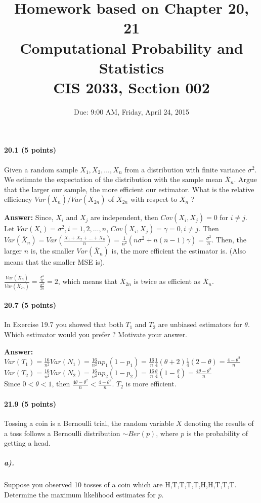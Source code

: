\documentclass{article} %
\title{Homework based on Chapter 20, 21\\
Computational Probability and Statistics \\
CIS 2033, Section 002}
\author{Due: 9:00 AM, Friday, April 24, 2015}
\begin{document}
\maketitle

\paragraph*{20.1 (5 points)} Given a random sample $X_1, X_2, \ldots, X_n$ from a distribution with finite variance $\sigma^2$. We estimate the expectation of the distribution with the sample mean $\overline{X}_n$. Argue that the larger our sample, the more efficient our estimator. What is the relative efficiency $Var(\overline{X}_n)/Var(\overline{X}_{2n})$ of $\overline{X}_{2n}$ with respect to $\overline{X}_n$ ? 

{\bf Answer:}  Since, $X_i$ and $X_j$  are independent, then $Cov(X_i, X_j) = 0$ for $i\neq j$. 
Let $Var(X_i) = \sigma^2, i=1, 2, \ldots, n$, $Cov(X_i, X_j) = \gamma = 0, i\neq j$. Then
$Var(\overline{X}_n) = Var(\frac{X_1+X_2+\ldots + X_n}{n}) = \frac{1}{n^2} \left( n\sigma^2 + n(n-1)\gamma \right) = \frac{\sigma^2}{n}$. 
Then, the larger $n$ is, the smaller $Var(\overline{X}_n)$ is, the more efficient the estimator is. 
(Also means that the smaller MSE is). 

$\frac{Var(\overline{X}_n)}{Var(\overline{X}_{2n})} = \frac{\frac{\sigma^2}{n}}{\frac{\sigma^2}{2n}}=2$, which means that $\overline{X}_{2n}$ is twice as efficient as $\overline{X}_n$.

\paragraph*{20.7 (5 points)}
In Exercise 19.7 you showed that both $T_1$ and $T_2$ are unbiased estimators for $\theta$. Which estimator would you prefer ? Motivate your answer. 

{\bf Answer:}  $Var(T_1) = \frac{16}{n^2}Var(N_1) = \frac{16}{n^2}np_1(1-p_1)= \frac{16}{n}\frac{1}{4}(\theta+2)\frac{1}{4}(2-\theta) = \frac{4-\theta^2}{n}$ \\
$Var(T_2) = \frac{16}{n^2}Var(N_2) = \frac{16}{n^2}np_2(1-p_2)= \frac{16}{n}\frac{\theta}{4}(1-\frac{\theta}{4}) = \frac{4\theta-\theta^2}{n}$ \\
Since $0 < \theta < 1$, then $\frac{4\theta-\theta^2}{n} < \frac{4-\theta^2}{n}$. $T_2$ is more efficient. 

\paragraph*{21.9 (5 points)} Tossing a coin is a Bernoulli trial, the random variable $X$ denoting the results of a toss follows a Bernoulli distribution $\sim Ber(p)$, where $p$ is the probability of getting a head. 
\subparagraph*{a).} Suppose you observed 10 tosses of a coin which are H,T,T,T,T,H,H,T,T,T. Determine the maximum likelihood estimates for $p$. 
\end{document}
